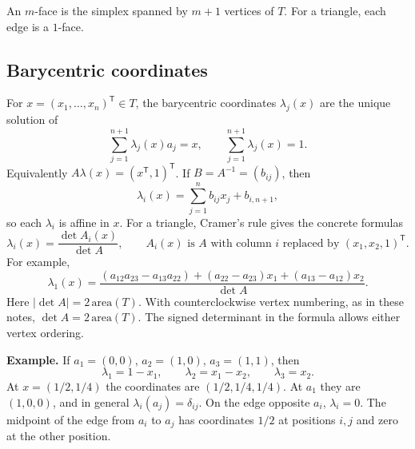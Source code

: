 \documentclass[11pt,a4paper]{article}
\begin{document}
An \(m\)-face is the simplex spanned by \(m+1\) vertices of \(T\).
For a triangle, each edge is a \(1\)-face.

\subsection{Barycentric coordinates}

For \(x=(x_1,\ldots,x_n)^\mathsf T\in T\), the barycentric coordinates
\(\lambda_j(x)\) are the unique solution of
\[
 \sum_{j=1}^{n+1}\lambda_j(x)a_j=x,\qquad
 \sum_{j=1}^{n+1}\lambda_j(x)=1.
\]
Equivalently \(A\lambda(x)=(x^\mathsf T,1)^\mathsf T\). If
\(B=A^{-1}=(b_{ij})\), then
\[
 \lambda_i(x)=\sum_{j=1}^{n}b_{ij}x_j+b_{i,n+1},
\]
so each \(\lambda_i\) is affine in \(x\). For a triangle, Cramer's rule
gives the concrete formulas
\[
 \lambda_i(x)=\frac{\det A_i(x)}{\det A},\qquad
 A_i(x)\text{ is }A\text{ with column }i\text{ replaced by }
 (x_1,x_2,1)^\mathsf T .
\]
For example,
\[
 \lambda_1(x)=
 \frac{
 (a_{12}a_{23}-a_{13}a_{22})
 +(a_{22}-a_{23})x_1
 +(a_{13}-a_{12})x_2}{\det A}.
\]
Here \(|\det A|=2\,\mathrm{area}(T)\). With counterclockwise vertex
numbering, as in these notes, \(\det A=2\,\mathrm{area}(T)\).
The signed determinant in the formula allows either vertex ordering.

\textbf{Example.} If \(a_1=(0,0)\), \(a_2=(1,0)\), \(a_3=(1,1)\), then
\[
 \lambda_1=1-x_1,\qquad \lambda_2=x_1-x_2,\qquad \lambda_3=x_2.
\]
At \(x=(1/2,1/4)\) the coordinates are \((1/2,1/4,1/4)\).
At \(a_1\) they are \((1,0,0)\), and in general
\(\lambda_i(a_j)=\delta_{ij}\). On the edge opposite \(a_i\),
\(\lambda_i=0\). The midpoint of the edge from \(a_i\) to \(a_j\) has
coordinates \(1/2\) at positions \(i,j\) and zero at the other position.

\begin{center}
\par{}
\end{center}
\end{document}
